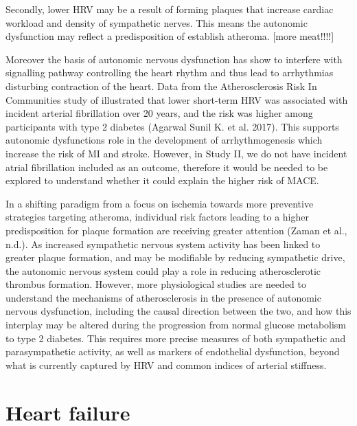 \documentclass[
  a4paper,
  headsepline=true,
  open=any]{scrbook}
\begin{document}
Secondly, lower HRV may be a result of forming plaques that increase
cardiac workload and density of sympathetic nerves. This means the
autonomic dysfunction may reflect a predisposition of establish
atheroma. {[}more meat!!!!{]}

Moreover the basis of autonomic nervous dysfunction has show to
interfere with signalling pathway controlling the heart rhythm and thus
lead to arrhythmias disturbing contraction of the heart. Data from the
Atherosclerosis Risk In Communities study of illustrated that lower
short-term HRV was associated with incident arterial fibrillation over
20 years, and the risk was higher among participants with type 2
diabetes (Agarwal Sunil K. et al. 2017). This supports autonomic
dysfunctions role in the development of arrhythmogenesis which increase
the risk of MI and stroke. However, in Study II, we do not have incident
atrial fibrillation included as an outcome, therefore it would be needed
to be explored to understand whether it could explain the higher risk of
MACE.

In a shifting paradigm from a focus on ischemia towards more preventive
strategies targeting atheroma, individual risk factors leading to a
higher predisposition for plaque formation are receiving greater
attention (Zaman et al., n.d.). As increased sympathetic nervous system
activity has been linked to greater plaque formation, and may be
modifiable by reducing sympathetic drive, the autonomic nervous system
could play a role in reducing atherosclerotic thrombus formation.
However, more physiological studies are needed to understand the
mechanisms of atherosclerosis in the presence of autonomic nervous
dysfunction, including the causal direction between the two, and how
this interplay may be altered during the progression from normal glucose
metabolism to type 2 diabetes. This requires more precise measures of
both sympathetic and parasympathetic activity, as well as markers of
endothelial dysfunction, beyond what is currently captured by HRV and
common indices of arterial stiffness.

\hypertarget{heart-failure-1}{%
\section{Heart failure}\label{heart-failure-1}}
\end{document}
